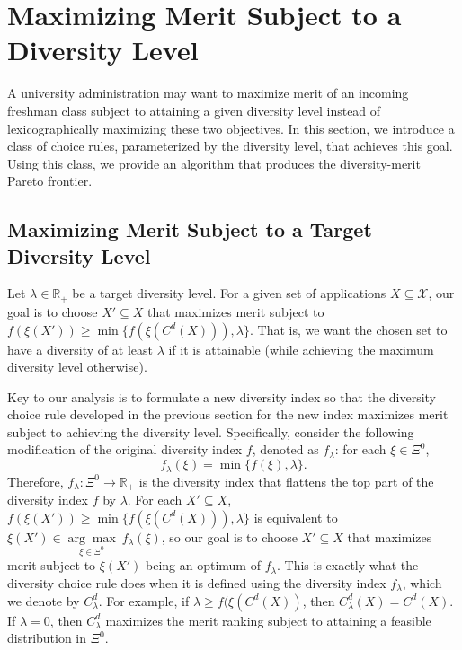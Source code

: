 \documentclass[12pt]{amsart}
\theoremstyle{remark}
\begin{document}
\section{Maximizing Merit Subject to a Diversity Level}\label{sec:frontier}
A university administration may want to maximize merit of an incoming freshman
class subject to attaining a given diversity level instead of lexicographically
maximizing these two objectives. In this section, we introduce a class of choice rules, parameterized by the diversity level, that achieves this goal. Using this class, we provide
an algorithm that produces the diversity-merit Pareto frontier.


\subsection{Maximizing Merit Subject to a Target Diversity Level} \label{sec:choice-target}

Let $\lambda\in \mathbb{R}_+$ be a target diversity level. For a given set of applications $X\subseteq \mathcal{X}$, our goal is to choose $X'\subseteq X$ that maximizes merit
subject to $f(\xi(X'))\geq \min\{f(\xi(C^d(X))),\lambda\}$.
That is, we want the chosen set to have a diversity
of at least $\lambda$ if it is attainable (while achieving the maximum diversity level otherwise).

Key to our analysis is to formulate a new diversity index so that the diversity choice rule developed in the previous section for the new index maximizes
merit subject to achieving the diversity level. Specifically,
consider the following modification of the original diversity index $f$, denoted as $f_\lambda$: for each $\xi\in \Xi^0$,
\[f_{\lambda}(\xi)=\min\{f(\xi),\lambda\}.\]
Therefore, $f_{\lambda}: \Xi^0 \rightarrow \mathbb{R}_+$ is the diversity index
that flattens the top part of the diversity index $f$ by $\lambda$.
For each $X'\subseteq X$, $f(\xi(X'))\geq \min\{f(\xi(C^d(X))),\lambda\}$ is equivalent to $\xi(X')\in \underset {\xi\in \Xi^0} {\arg\max} \: f_\lambda(\xi)$, so our goal is to choose $X'\subseteq X$ that maximizes merit  subject to $\xi(X')$ being an optimum of $f_\lambda$.
This is exactly what the diversity choice rule does when it is defined using the diversity index $f_{\lambda}$, which we denote by $C^d_{\lambda}$.
For example, if $\lambda\geq f(\xi(C^d(X))$, then $C^d_{\lambda}(X)=C^d(X)$.
If $\lambda=0$, then $C^d_{\lambda}$ maximizes the merit ranking subject to attaining a feasible distribution in $\Xi^0$.
\end{document}
